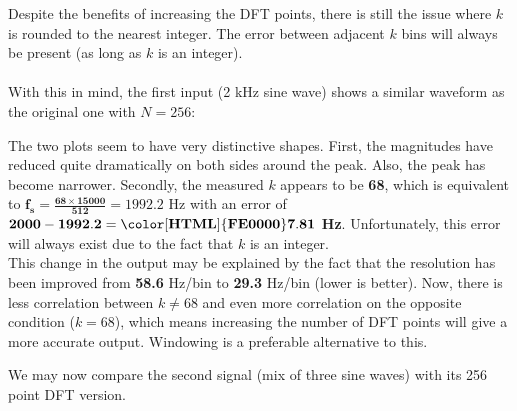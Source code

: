 Despite the benefits of increasing the DFT points, there is still the issue where $k$ is rounded to the nearest integer. The error between adjacent $k$ bins will always be present (as long as $k$ is an integer).

\newpage
\paragraph{}
With this in mind, the first input (2 kHz sine wave) shows a similar waveform as the original one with $N = 256$:


The two plots seem to have very distinctive shapes. First, the magnitudes have reduced quite dramatically on both sides around the peak. Also, the peak has become narrower. Secondly, the measured $k$ appears to be \textbf{68}, which is equivalent to $\mathbf{f_s = \frac{68\times 15000}{512} = 1992.2}$ Hz with an error of $\mathbf{2000 - 1992.2 = \color[HTML]{FE0000}7.81}$ \textbf{Hz}. Unfortunately, this error will always exist due to the fact that $k$ is an integer.\\

This change in the output may be explained by the fact that the resolution has been improved from \textbf{58.6} Hz/bin to \textbf{29.3} Hz/bin (lower is better). Now, there is less correlation between $k \neq 68$ and even more correlation on the opposite condition ($k = 68$), which means increasing the number of DFT points will give a more accurate output. Windowing is a preferable alternative to this.

\newpage
We may now compare the second signal (mix of three sine waves) with its 256 point DFT version.

